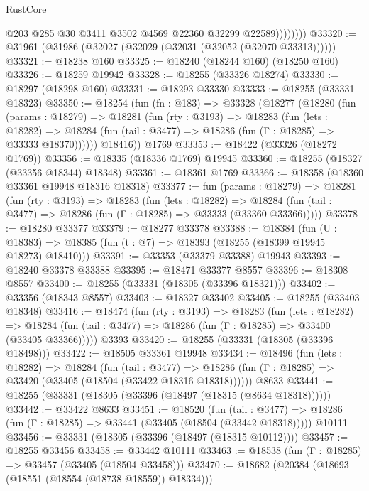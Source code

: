 \begin{lexlean}{RustCore}
\begin{coremodule}
                    @203
                    @285
                    @30
                    @3411
                    @3502
                    @4569
                    @22360
                    @32299
                    @22589))))))))
@33320 := @31961 (@31986 (@32027 (@32029 (@32031 (@32052 (@32070 @33313))))))
@33321 := @18238 @160
@33325 := @18240 (@18244 @160) (@18250 @160)
@33326 := @18259 @19942
@33328 := @18255 (@33326 @18274)
@33330 := @18297 (@18298 @160)
@33331 := @18293 @33330
@33333 := @18255 (@33331 @18323)
@33350 := @18254
    (fun (fn : @183) =>
    @33328
      (@18277
        (@18280
          (fun (params : @18279) =>
          @18281
            (fun (rty : @3193) =>
            @18283
              (fun (lets : @18282) =>
              @18284 (fun (tail : @3477) => @18286 (fun (Γ : @18285) => @33333 @18370))))))
        @18416))
    @1769
@33353 := @18422 (@33326 (@18272 @1769))
@33356 := @18335 (@18336 @1769) @19945
@33360 := @18255 (@18327 (@33356 @18344) @18348)
@33361 := @18361 @1769
@33366 := @18358 (@18360 @33361 @19948 @18316 @18318)
@33377 := fun (params : @18279) =>
  @18281
    (fun (rty : @3193) =>
    @18283
      (fun (lets : @18282) =>
      @18284 (fun (tail : @3477) => @18286 (fun (Γ : @18285) => @33333 (@33360 @33366)))))
@33378 := @18280 @33377
@33379 := @18277 @33378
@33388 := @18384
    (fun (U : @18383) => @18385 (fun (t : @7) => @18393 (@18255 (@18399 @19945 @18273) @18410)))
@33391 := @33353 (@33379 @33388) @19943
@33393 := @18240 @33378 @33388
@33395 := @18471 @33377 @8557
@33396 := @18308 @8557
@33400 := @18255 (@33331 (@18305 (@33396 @18321)))
@33402 := @33356 (@18343 @8557)
@33403 := @18327 @33402
@33405 := @18255 (@33403 @18348)
@33416 := @18474
    (fun (rty : @3193) =>
    @18283
      (fun (lets : @18282) =>
      @18284 (fun (tail : @3477) => @18286 (fun (Γ : @18285) => @33400 (@33405 @33366)))))
    @3393
@33420 := @18255 (@33331 (@18305 (@33396 @18498)))
@33422 := @18505 @33361 @19948
@33434 := @18496
    (fun (lets : @18282) =>
    @18284
      (fun (tail : @3477) =>
      @18286 (fun (Γ : @18285) => @33420 (@33405 (@18504 (@33422 @18316 @18318))))))
    @8633
@33441 := @18255 (@33331 (@18305 (@33396 (@18497 (@18315 (@8634 @18318))))))
@33442 := @33422 @8633
@33451 := @18520
    (fun (tail : @3477) => @18286 (fun (Γ : @18285) => @33441 (@33405 (@18504 (@33442 @18318)))))
    @10111
@33456 := @33331 (@18305 (@33396 (@18497 (@18315 @10112))))
@33457 := @18255 @33456
@33458 := @33442 @10111
@33463 := @18538 (fun (Γ : @18285) => @33457 (@33405 (@18504 @33458)))
@33470 := @18682 (@20384 (@18693 (@18551 (@18554 (@18738 @18559)) @18334)))

\end{coremodule}
\end{lexlean}
